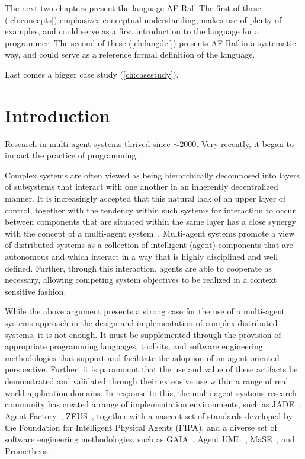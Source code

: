 \documentclass[a4paper,12pt,oneside,fleqn]{book} %
\newcommand{\rg}[1]{\marginpar{\tiny\raggedright\textcolor{blue}{\bf rg:} #1}}
\renewcommand{\rg}{}
\begin{document}
The next two chapters present the language AF-Raf. The first of these
(\autoref{ch:concepts}) emphasizes conceptual understanding, makes use of
plenty of examples, and could serve as a first introduction to the language
for a programmer. The second of these (\autoref{ch:langdef}) presents
AF-Raf in a systematic way, and could serve as a reference formal
definition of the language.

Last comes a bigger case study (\autoref{ch:casestudy}).

\mainmatter
\chapter{Introduction}\label{ch:intro} %

Research in multi-agent systems thrived since $\sim2000$.
Very recently, it began to impact the practice of programming.

Complex systems are often viewed as being hierarchically decomposed into layers
of subsystems that interact with one another in an inherently decentralized
manner. It is increasingly accepted that this natural lack of an upper layer of
control, together with the tendency within such systems for interaction to
occur between components that are situated within the same layer has a close
synergy with the concept of a multi-agent
system~\cite{Jennings00agent-orientedsoftware}. Multi-agent systems promote a
view of distributed systems as a collection of intelligent (agent) components
that are autonomous and which interact in a way that is highly disciplined and
well defined. Further, through this interaction, agents are able to cooperate
as necessary, allowing competing system objectives to be realized in a context
sensitive fashion.

While the above argument presents a strong case for the use of a multi-agent
systems approach in the design and implementation of complex distributed
systems, it is not enough. It must be supplemented through the provision of
appropriate programming languages, toolkits, and software engineering
methodologies that support and facilitate the adoption of an agent-oriented
perspective. Further, it is paramount that the use and value of these artifacts
be demonstrated and validated through their extensive use within a range of
real world application domains. In response to this, the multi-agent systems
research community has created a range of implementation environments, such as
JADE~\cite{DBLP:books/sp/map2005/BellifemineBCP05}, Agent
Factory~\cite{collier1999agent}, ZEUS~\cite{DBLP:conf/agents/NwanaNLC99},
together with a nascent set of standards developed by the Foundation for
Intelligent Physical Agents (FIPA), and a diverse set of software engineering
methodologies, such as GAIA~\cite{DBLP:journals/aamas/WooldridgeJK00}, Agent
UML~\cite{bauer2001agent}, MaSE~\cite{deloach2001analysis}, and
Prometheus~\cite{DBLP:conf/atal/PadghamW02}.
\end{document}
